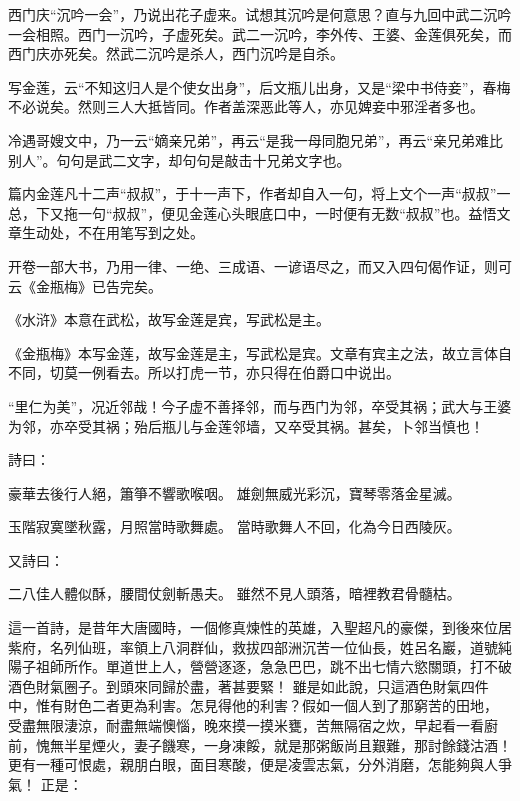 {西门庆“沉吟一会”，乃说出花子虚来。试想其沉吟是何意思？直与九回中武二沉吟一会相照。西门一沉吟，子虚死矣。武二一沉吟，李外传、王婆、金莲俱死矣，而西门庆亦死矣。然武二沉吟是杀人，西门沉吟是自杀。

写金莲，云“不知这归人是个使女出身”，后文瓶儿出身，又是“梁中书侍妾”，春梅不必说矣。然则三人大抵皆同。作者盖深恶此等人，亦见婢妾中邪淫者多也。

冷遇哥嫂文中，乃一云“嫡亲兄弟”，再云“是我一母同胞兄弟”，再云“亲兄弟难比别人”。句句是武二文字，却句句是敲击十兄弟文字也。

篇内金莲凡十二声“叔叔”，于十一声下，作者却自入一句，将上文个一声“叔叔”一总，下又拖一句“叔叔”，便见金莲心头眼底口中，一时便有无数“叔叔”也。益悟文章生动处，不在用笔写到之处。

开卷一部大书，乃用一律、一绝、三成语、一谚语尽之，而又入四句偈作证，则可云《金瓶梅》已告完矣。

《水浒》本意在武松，故写金莲是宾，写武松是主。

《金瓶梅》本写金莲，故写金莲是主，写武松是宾。文章有宾主之法，故立言体自不同，切莫一例看去。所以打虎一节，亦只得在伯爵口中说出。

“里仁为美”，况近邻哉！今子虚不善择邻，而与西门为邻，卒受其祸；武大与王婆为邻，亦卒受其祸；殆后瓶儿与金莲邻墙，又卒受其祸。甚矣，卜邻当慎也！

} %

詩曰：

豪華去後行人絕，簫箏不響歌喉咽。
雄劍無威光彩沉，寶琴零落金星滅。

玉階寂寞墜秋露，月照當時歌舞處。
當時歌舞人不回，化為今日西陵灰。

又詩曰：

二八佳人體似酥，腰間仗劍斬愚夫。
雖然不見人頭落，暗裡教君骨髓枯。

這一首詩，是昔年大唐國時，一個修真煉性的英雄，入聖超凡的豪傑，到後來位居紫府，名列仙班，率領上八洞群仙，救拔四部洲沉苦一位仙長，姓呂名巖，道號純陽子祖師所作。單道世上人，營營逐逐，急急巴巴，跳不出七情六慾關頭，打不破酒色財氣圈子。到頭來同歸於盡，著甚要緊！
雖是如此說，只這酒色財氣四件中，惟有財色二者更為利害。怎見得他的利害？假如一個人到了那窮苦的田地，
受盡無限淒涼，耐盡無端懊惱，晚來摸一摸米甕，苦無隔宿之炊，早起看一看廚前，愧無半星煙火，妻子饑寒，一身凍餒，就是那粥飯尚且艱難，那討餘錢沽酒！
更有一種可恨處，親朋白眼，面目寒酸，便是凌雲志氣，分外消磨，怎能夠與人爭氣！
正是：

